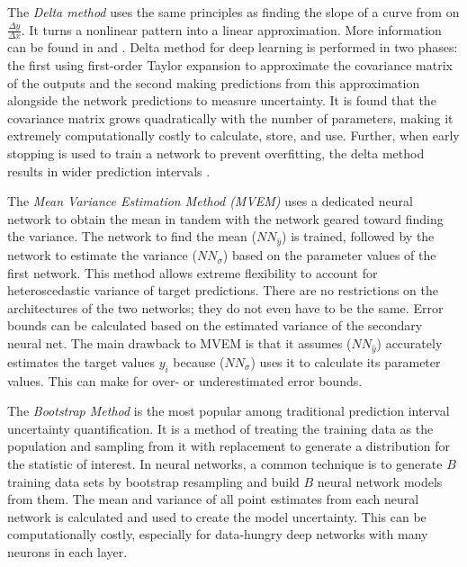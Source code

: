 The \textit{Delta method} uses the same principles as finding the slope of a curve from on $\frac{\Delta y}{\Delta x}$.  It turns a nonlinear pattern into a linear approximation.  More information can be found in \cite{nilsen2022epistemic} and \cite{hwang1997prediction}.  Delta method for deep learning is performed in two phases: the first using first-order Taylor expansion to approximate the covariance matrix of the outputs and the second making predictions from this approximation alongside the network predictions to measure uncertainty. It is found that the covariance matrix grows quadratically with the number of parameters, making it extremely computationally costly to calculate, store, and use.  Further, when early stopping is used to train a network to prevent overfitting, the delta method results in wider prediction intervals \cite{8371683}.

The \textit{Mean Variance Estimation Method (MVEM)} uses a dedicated neural network to obtain the mean in tandem with the network geared toward finding the variance.  The network to find the mean ($NN_{\hat{y}}$) is trained, followed by the network to estimate the variance ($NN_{\sigma}$) based on the parameter values of the first network.  This method allows extreme flexibility to account for heteroscedastic variance of target predictions.  There are no restrictions on the architectures of the two networks; they do not even have to be the same.  Error bounds can be calculated based on the estimated variance of the secondary neural net.  The main drawback to MVEM is that it assumes ($NN_{\hat{y}}$) accurately estimates the target values $y_i$ because ($NN_{\sigma}$) uses it to calculate its parameter values.  This can make for over- or underestimated error bounds.

The \textit{Bootstrap Method} is the most popular among traditional prediction interval uncertainty quantification. %
It is a method of treating the training data as the population and sampling from it with replacement to generate a distribution for the statistic of interest.
In neural networks, a common technique is to
generate  $B$ training data sets by bootstrap resampling and build $B$ neural network models from them.  The mean and variance of all point estimates from each neural network is calculated and used to create the model uncertainty. This can be computationally costly, especially for data-hungry deep networks with many neurons in each layer.  %


